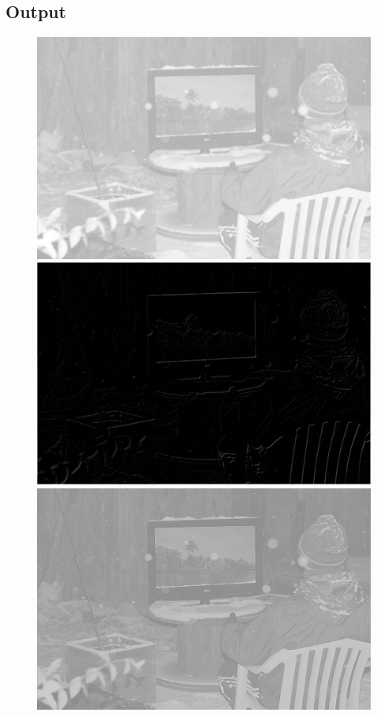 \documentclass[pdftex,a4paper,10pt,titlepage]{article}
\begin{document}
\subsection{Output}
\begin{figure}[h]
\includegraphics[scale=0.45]{snow.png}
\includegraphics[scale=0.225]{task9a.png} 
\includegraphics[scale=0.225]{task9b.png} 

\end{figure}
\end{document}

